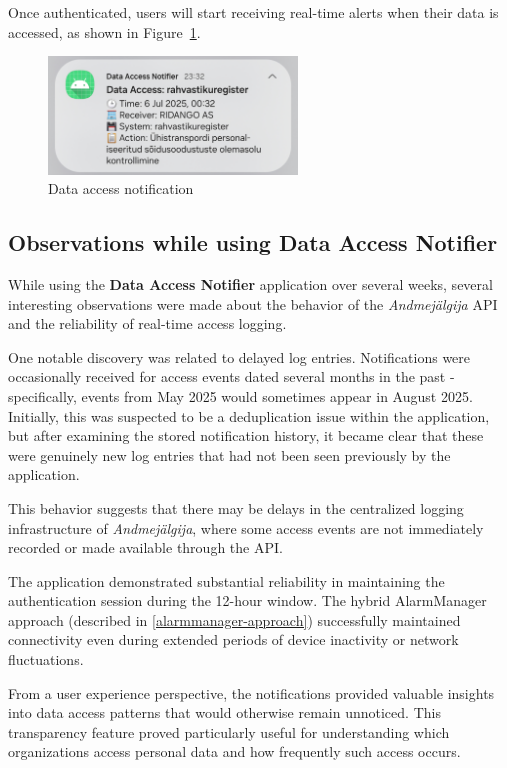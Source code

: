 Once authenticated, users will start receiving real-time alerts when their data is accessed, as shown in Figure~\ref{fig:data-access-notification}.

\begin{figure}[H]
\centering
\includegraphics[width=250px]{english/figures/IMG_20250812_233325_272.jpg}
\caption{Data access notification}
\label{fig:data-access-notification}
\end{figure}

\subsection{Observations while using \textbf{Data Access Notifier}}
\label{observations}

While using the \textbf{Data Access Notifier} application over several weeks, several interesting observations were made about the behavior of the \textit{Andmejälgija} API and the reliability of real-time access logging.

One notable discovery was related to delayed log entries. Notifications were occasionally received for access events dated several months in the past - specifically, events from May 2025 would sometimes appear in August 2025. Initially, this was suspected to be a deduplication issue within the application, but after examining the stored notification history, it became clear that these were genuinely new log entries that had not been seen previously by the application.

This behavior suggests that there may be delays in the centralized logging infrastructure of \textit{Andmejälgija}, where some access events are not immediately recorded or made available through the API.

The application demonstrated substantial reliability in maintaining the authentication session during the 12-hour window. The hybrid AlarmManager approach (described in \ref{alarmmanager-approach}) successfully maintained connectivity even during extended periods of device inactivity or network fluctuations.

From a user experience perspective, the notifications provided valuable insights into data access patterns that would otherwise remain unnoticed. This transparency feature proved particularly useful for understanding which organizations access personal data and how frequently such access occurs.

